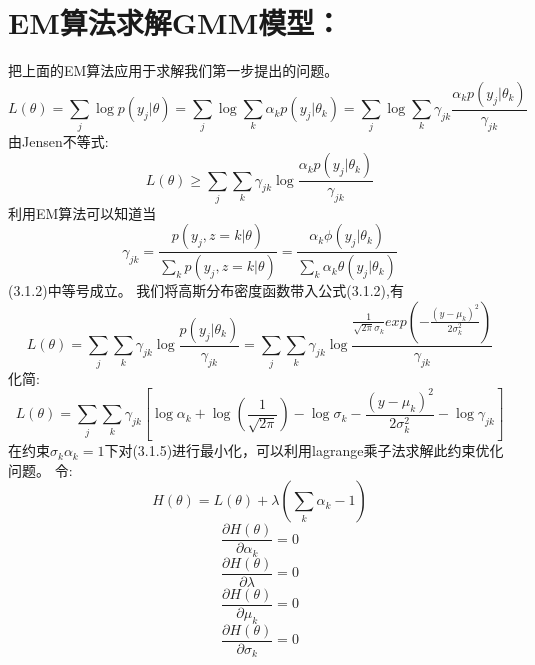 \documentclass{article}
\begin{document}
\section{EM算法求解GMM模型：}
把上面的EM算法应用于求解我们第一步提出的问题。\\
\begin{equation}
L(\theta)=\sum_j \log p(y_j| \theta)=\sum_j \log \sum_k \alpha_k p(y_j|\theta_k)=\sum_j \log \sum_k \gamma_{jk} \frac{\alpha_k p(y_j|\theta_k)}{\gamma_{jk}} \tag{3.1.1}
\end{equation}
由Jensen不等式:
\begin{equation}
L(\theta) \ge \sum_j \sum_k \gamma_{jk} \log \frac{\alpha_k p(y_j|\theta_k)}{\gamma_{jk}} \tag{3.1.2}
\end{equation}
利用EM算法可以知道当
\begin{equation}
\gamma_{jk}=\frac{p(y_j,z=k|\theta)}{\sum_{k}p(y_j,z=k|\theta)}=\frac{\alpha_k \phi(y_j|\theta_k)}{\sum_k \alpha_k \theta(y_j|\theta_k)}  \tag{3.1.3}
\end{equation}
(3.1.2)中等号成立。
我们将高斯分布密度函数带入公式(3.1.2),有
\begin{equation}
L(\theta)=\sum_j \sum_k \gamma_{jk} \log \frac{p(y_j|\theta_k)}{\gamma_{jk}}=\sum_j \sum_k \gamma_{jk} \log \frac{\frac{1}{\sqrt{2\pi}\sigma_k}exp(-\frac{(y-\mu_k)^2}{2\sigma_k^2})}{\gamma_{jk}}  \tag {3.1.4}
\end{equation}
化简:
\begin{equation}
L(\theta)=\sum_j \sum_k \gamma_{jk}[\log \alpha_k+\log(\frac{1}{\sqrt{2\pi}})-\log \sigma_k-\frac{(y-\mu_k)^2}{2\sigma_k^2}-\log \gamma_{jk}] \tag {3.1.5}
\end{equation}
在约束$\sigma_k \alpha_k=1$下对(3.1.5)进行最小化，可以利用lagrange乘子法求解此约束优化问题。
令:
\begin{equation}
H(\theta)=L(\theta)+\lambda(\sum_k\alpha_k-1)　  \tag{3.1.6}
\end{equation}
\begin{equation}
\frac{\partial{H(\theta)}}{\partial{\alpha_k}}=0 \tag{3.1.7}
\end{equation}
\begin{equation}
\frac{\partial{H(\theta)}}{\partial{\lambda}}=0 \tag{3.1.8}
\end{equation}
\begin{equation}
\frac{\partial{H(\theta)}}{\partial{\mu_k}}=0 \tag{3.1.9}
\end{equation}
\begin{equation}
\frac{\partial{H(\theta)}}{\partial{\sigma_k}}=0 \tag{3.1.10}
\end{equation}
\end{document}
